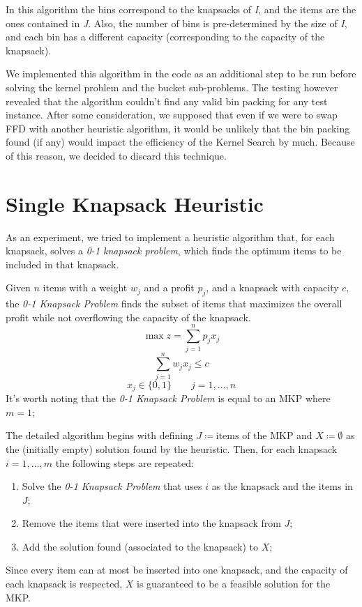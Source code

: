In this algorithm the bins correspond to the knapsacks of \textit{I},
and the items are the ones contained in \textit{J}.
Also, the number of bins is pre-determined by the size of \textit{I},
and each bin has a different capacity (corresponding to the capacity of the knapsack).

We implemented this algorithm in the code as an additional step to be run
before solving the kernel problem and the bucket sub-problems.
The testing however revealed that the algorithm couldn't find any valid bin packing
for any test instance.
After some consideration, we supposed that even if we were to swap FFD with another
heuristic algorithm, it would be unlikely that the bin packing found (if any) would impact the efficiency of the
Kernel Search by much.
Because of this reason, we decided to discard this technique.


\section{Single Knapsack Heuristic}
As an experiment, we tried to implement a heuristic algorithm that,
for each knapsack, solves a \textit{0-1 knapsack problem},
which finds the optimum items to be included in that knapsack.

Given \(n\) items with a weight \(w_{j}\) and a profit \(p_{j}\),
and a knapsack with capacity \(c\), the \textit{0-1 Knapsack Problem} finds
the subset of items that maximizes the overall profit while not overflowing the capacity of the knapsack.
\begin{equation}
    \max{z} = \sum_{j=1}^{n} p_{j} x_{j}
\end{equation}
\begin{equation}
    \sum_{j=1}^{n} w_{j} x_{j} \leq c
\end{equation}
\begin{equation}
    x_{j} \in \{0,1\} \qquad j=1,\dots,n
\end{equation}
It's worth noting that the \textit{0-1 Knapsack Problem} is equal to an MKP
where \(m=1\);

The detailed algorithm begins with defining \(J \coloneqq \text{items of the MKP}\)
and \(X \coloneqq \emptyset\) as the (initially empty) solution found by the heuristic.
Then, for each knapsack \(i = 1,\dots,m\) the following steps are repeated:
\begin{enumerate}
    \item Solve the \textit{0-1 Knapsack Problem} that uses \(i\) as the knapsack and the items in \(J\);
    \item Remove the items that were inserted into the knapsack from \(J\);
    \item Add the solution found (associated to the knapsack) to \(X\);
\end{enumerate}
Since every item can at most be inserted into one knapsack, and the capacity of each
knapsack is respected, \(X\) is guaranteed to be a feasible solution for the MKP\@.

